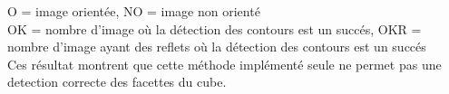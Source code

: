 O = image orientée, NO = image non orienté \\
OK = nombre d'image où la détection des contours est un succés, OKR = nombre d'image ayant des reflets où la détection des contours est un succés\\

  Ces résultat montrent que cette méthode implémenté seule ne permet pas une detection correcte des facettes du cube.

  

